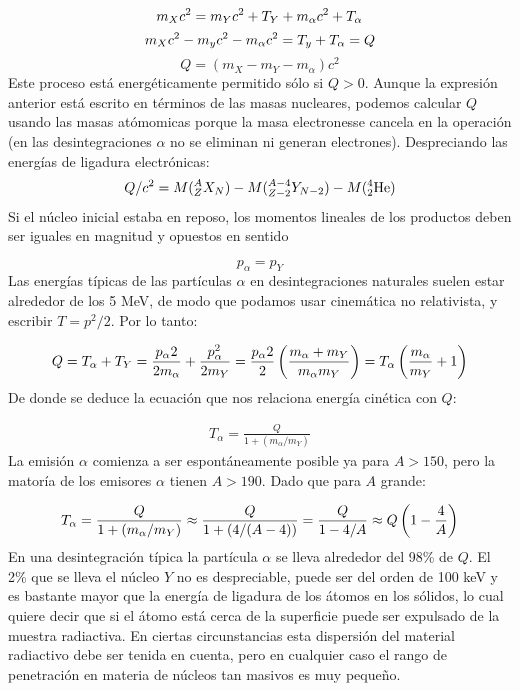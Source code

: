 \begin{equation}
    m_X c^2 = m_Y c^2 + T_Y + m_\alpha c^2 + T_\alpha \\
\end{equation}    
\begin{equation}
    m_X c^2 - m_y c^2 - m_\alpha  c^2  = T_y + T_\alpha = Q \\
\end{equation}    
\begin{equation}
    Q = (m_X - m_Y - m_\alpha)c^2
\end{equation}    
Este proceso está energéticamente permitido sólo si $Q>0$. Aunque la expresión anterior está escrito en términos de las masas nucleares, podemos calcular $Q$ usando las masas atómomicas porque la masa electronesse cancela en la operación (en las desintegraciones $\alpha$ no se eliminan ni generan electrones). Despreciando las energías de ligadura electrónicas:
\begin{eqnarray}
Q/c^2 = M(^A_Z X_N) - M(^{A-4}_{Z-2}Y_{N-2}) - M(^4_2\text{He})
\end{eqnarray}
Si el núcleo inicial estaba en reposo, los momentos lineales de los productos deben ser iguales en magnitud y opuestos en sentido

\begin{equation}
    p_\alpha = p_Y
\end{equation}
Las energías típicas de las partículas $\alpha$ en desintegraciones naturales suelen estar alrededor de los 5 MeV, de modo que podamos usar cinemática no relativista, y escribir $T=p^2/2$. Por lo tanto:

\begin{equation}
	Q=T_\alpha + T_Y = \frac{p_\alpha2}{2m_\alpha} + \frac{p^2_\alpha}{2m_Y} = \frac{p_\alpha2}{2} \left( \frac{m_\alpha + m_Y}{m_\alpha m_Y} \right) = T_\alpha \left( \frac{m_\alpha}{m_Y} + 1  \right) 
\end{equation}	
De donde se deduce la ecuación que nos relaciona energía cinética con $Q$:

\begin{eqnarray}
	T_\alpha = \frac{Q}{1+(m_\alpha/m_Y)}
\end{eqnarray}
La emisión $\alpha$ comienza a ser espontáneamente posible ya para $A>150$, pero la matoría de los emisores $\alpha$ tienen $A>190$. Dado que para $A$ grande:

\begin{eqnarray}
	T_\alpha = \frac{Q}{1+(m_\alpha/m_Y)} \approx \frac{Q}{1+(4/(A-4))}= \frac{Q}{1-4/A} \approx Q \left( 1-\frac{4}{A} \right)
\end{eqnarray}
En una desintegración típica la partícula $\alpha$ se lleva alrededor del 98\% de $Q$. El 2\% que se lleva el núcleo $Y$ no es despreciable, puede ser del orden de 100 keV y es bastante mayor que la energía de ligadura de los átomos en los sólidos, lo cual quiere decir que si el átomo está cerca de la superficie puede ser expulsado de la muestra radiactiva. En ciertas circunstancias esta dispersión del material radiactivo debe ser tenida en cuenta, pero en cualquier caso el rango de penetración en materia de núcleos tan masivos es muy pequeño. 

